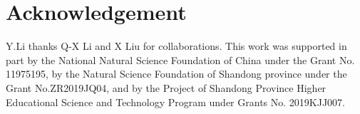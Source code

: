\documentclass[11pt]{article}
\begin{document}
\section*{Acknowledgement}
Y.Li thanks Q-X Li and X Liu for collaborations. This work was supported in part by the National Natural Science Foundation of China under the Grant No. 11975195, by the Natural Science Foundation of Shandong province under the Grant No.ZR2019JQ04, and  by the Project of Shandong Province Higher Educational Science and Technology Program under Grants No. 2019KJJ007.

{\small

}
\end{document}
